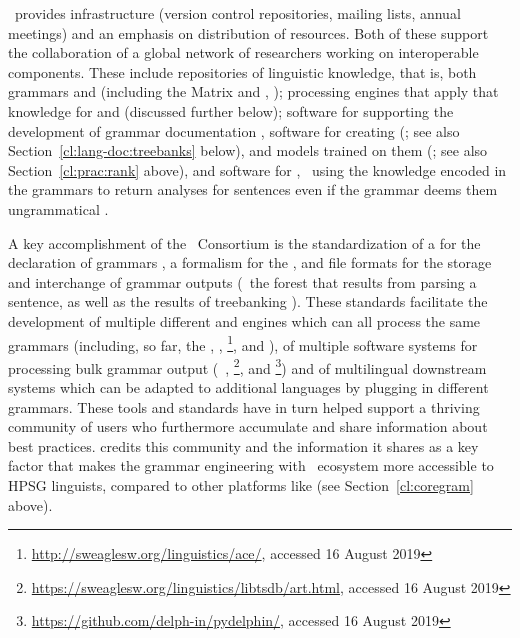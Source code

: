 \documentclass[output=paper,nonflat]{langsci/langscibook}
\begin{document}
\delphin\ provides infrastructure (version control repositories,
mailing lists, annual meetings) and an emphasis on 
distribution of resources. Both of these support the collaboration of a
global network of researchers working on interoperable
components. These include repositories of linguistic knowledge, that
is, both grammars and  (including the Matrix and ,
\citealt{Fokkens:14}); processing engines that apply that
knowledge for  and  (discussed further below);
software for supporting the development of grammar documentation
\citep[e.g.,][]{Hashimoto-etal:07}, software for creating 
(\citealt{OFTM2004a-u,Packard:15}; see also Section~\ref{cl:lang-doc:treebanks} below), 
and  models trained on them
(\citealt{Tou:Man:Fli:Oep:05}; see also Section~\ref{cl:prac:rank} above), and
software for , \ie\ using the knowledge encoded in
the grammars to return analyses for sentences even if the grammar
deems them ungrammatical
\citep{W11-2923,buys2017parse,chen2018parse}.

A key accomplishment of the \delphin\ Consortium is the standardization
of a  for the declaration of grammars
\citep{Copestake:02:CLE}, a formalism for the 
\citep{CFPS2005a}, and file formats for the storage and interchange of
grammar outputs (\eg\ the forest that results from parsing a sentence,
as well as the results of treebanking \citep{Oepen:01,OFTM2004a-u}).
These standards facilitate the development of multiple different
 and  engines which can all process the same grammars
(including, so far,
the  \citep{Copestake2002a},
 \citep{callmeier00},
\footnote{\url{http://sweaglesw.org/linguistics/ace/}, accessed 16 August 2019},
and  \citep{Slayden2012a-u}),
of multiple software systems for processing bulk grammar output
(\itsdb\ \citep{Oepen:01},\is{\itsdb}
\footnote{\url{https://sweaglesw.org/linguistics/libtsdb/art.html}, accessed 16 August 2019}, and \footnote{\url{https://github.com/delph-in/pydelphin/}, accessed 16 August 2019})
and of multilingual downstream systems which can be adapted to additional
languages by plugging in different grammars.
These tools and standards have in turn helped support a thriving community
of users who furthermore accumulate and share information about best practices.
\citet[234]{MelnikHandWritten} credits this community and the information it
shares as a key factor that makes the grammar engineering with
\delphin\ ecosystem more accessible to HPSG linguists, 
compared to other platforms like  (see Section~\ref{cl:coregram} above).
\end{document}
